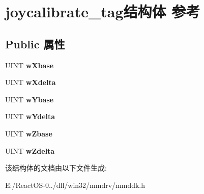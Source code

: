 \hypertarget{structjoycalibrate__tag}{}\section{joycalibrate\+\_\+tag结构体 参考}
\label{structjoycalibrate__tag}
\subsection*{Public 属性}
\begin{DoxyCompactItemize}
\item 
\mbox{\label{structjoycalibrate__tag_ac0e3cbdff7218dd482678162b398eec0}} 
U\+I\+NT {\bfseries w\+Xbase}
\item 
\mbox{\label{structjoycalibrate__tag_a82ca1041d81b964cbe4e4d0ddef3798d}} 
U\+I\+NT {\bfseries w\+Xdelta}
\item 
\mbox{\label{structjoycalibrate__tag_aa3b76a1c10cec7e0e37cccbca8c460e0}} 
U\+I\+NT {\bfseries w\+Ybase}
\item 
\mbox{\label{structjoycalibrate__tag_a09b9f10882d8368e03a65d3501eac772}} 
U\+I\+NT {\bfseries w\+Ydelta}
\item 
\mbox{\label{structjoycalibrate__tag_a0cdbee7f3f8c5027babd85c065af305e}} 
U\+I\+NT {\bfseries w\+Zbase}
\item 
\mbox{\label{structjoycalibrate__tag_a46846635f0a975dbccbdd61b95bf4088}} 
U\+I\+NT {\bfseries w\+Zdelta}
\end{DoxyCompactItemize}


该结构体的文档由以下文件生成\+:\begin{DoxyCompactItemize}
\item 
E\+:/\+React\+O\+S-\/0../dll/win32/mmdrv/mmddk.\+h\end{DoxyCompactItemize}
